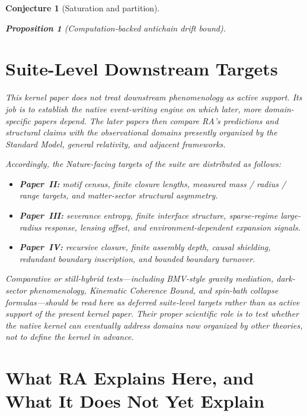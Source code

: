 \documentclass[11pt]{article}
\newtheorem{proposition}{Proposition}
\newtheorem{conjecture}{Conjecture}
\begin{document}
\begin{conjecture}[Saturation and partition]
\begin{proposition}[Computation-backed antichain drift bound]
\section{Suite-Level Downstream Targets}
\label{sec:predictions}

This kernel paper does not treat downstream phenomenology as active support. Its job is to establish the native event-writing engine on which later, more domain-specific papers depend. The later papers then compare RA's predictions and structural claims with the observational domains presently organized by the Standard Model, general relativity, and adjacent frameworks.

Accordingly, the Nature-facing targets of the suite are distributed as follows:
\begin{itemize}
    \item \textbf{Paper~II:} motif census, finite closure lengths, measured mass / radius / range targets, and matter-sector structural asymmetry.
    \item \textbf{Paper~III:} severance entropy, finite interface structure, sparse-regime large-radius response, lensing offset, and environment-dependent expansion signals.
    \item \textbf{Paper~IV:} recursive closure, finite assembly depth, causal shielding, redundant boundary inscription, and bounded boundary turnover.
\end{itemize}

Comparative or still-hybrid tests---including BMV-style gravity mediation, dark-sector phenomenology, Kinematic Coherence Bound, and spin-bath collapse formulas---should be read here as deferred suite-level targets rather than as active support of the present kernel paper. Their proper scientific role is to test whether the native kernel can eventually address domains now organized by other theories, not to define the kernel in advance.

\section{What RA Explains Here, and What It Does Not Yet Explain}
\label{sec:status}


\end{proposition}
\end{conjecture}
\end{document}

